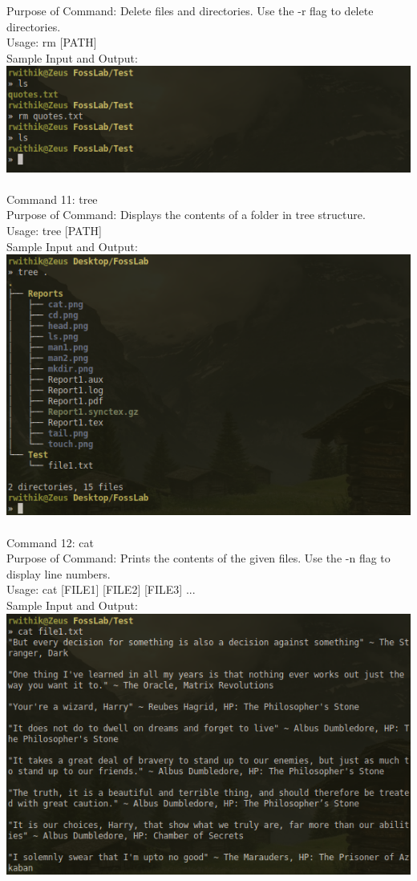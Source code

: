\documentclass[10pt,a4paper]{report}
\begin{document}
Purpose of Command: Delete files and directories. Use the -r flag to delete directories.\\
Usage: rm [PATH]\\
Sample Input and Output: \\
\includegraphics[scale=2]{rm.png}\\
\\
Command 11: tree\\
Purpose of Command: Displays the contents of a folder in tree structure.\\
Usage: tree [PATH]\\
Sample Input and Output: \\
\includegraphics[scale=.5]{tree.png}\\
\pagebreak
\\
Command 12: cat\\
Purpose of Command: Prints the contents of the given files. Use the -n flag to display line numbers.\\
Usage: cat [FILE1] [FILE2] [FILE3] ...\\
Sample Input and Output: \\
\includegraphics[scale=.5]{cat.png}\\
\end{document}
